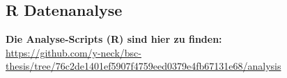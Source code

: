 \documentclass[12pt,a4paper]{article}        %
\begin{document}
\subsection{R Datenanalyse}
\label{appendix_analysis}
\begin{tcolorbox}[
    width=\textwidth,
    boxrule=1pt,
    arc=0pt,
    colback=white,
    left=6pt, right=6pt, top=6pt, bottom=6pt
  ]
  \textbf{Die Analyse-Scripts (R) sind hier zu finden:}\\
  \url{https://github.com/y-neck/bsc-thesis/tree/76c2de1401ef5907f4759eed0379e4fb67131e68/analysis}
\end{tcolorbox}
\end{document}
